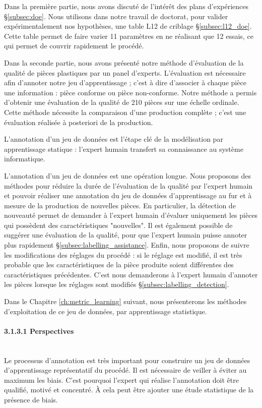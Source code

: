 Dans la première partie, nous avons discuté de l'intérêt des plans d'expériences §\ref{subsec:doe}.
Nous utilisons dans notre travail de doctorat, pour valider expérimentalement nos hypothèses, une table L12 de criblage §\ref{subsec:l12_doe}.
Cette table permet de faire varier 11 paramètres en ne réalisant que 12 essais, ce qui permet de couvrir rapidement le procédé.

Dans la seconde partie, nous avons présenté notre méthode d'évaluation de la qualité de pièces plastiques par un panel d'experts.
L'évaluation est nécessaire afin d'annoter notre jeu d'apprentissage ; c'est à dire d'associer à chaque pièce une information : pièce conforme ou pièce non-conforme.
Notre méthode a permis d'obtenir une évaluation de la qualité de 210 pièces sur une échelle ordinale.
Cette méthode nécessite la comparaison d'une production complète ; c'est une évaluation réalisée à posteriori de la production.

L'annotation d'un jeu de données est l'étape clé de la modélisation par apprentissage statique : l'expert humain transfert sa connaissance au système informatique.

L'annotation d'un jeu de données est une opération longue.
Nous proposons des méthodes pour réduire la durée de l'évaluation de la qualité par l'expert humain et pouvoir réaliser une annotation du jeu de données d'apprentissage au fur et à mesure de la production de nouvelles pièces.
En particulier, la détection de nouveauté permet de demander à l'expert humain d'évaluer uniquement les pièces qui possèdent des caractéristiques "nouvelles".
Il est également possible de suggérer une évaluation de la qualité, pour que l'expert humain puisse annoter plus rapidement §\ref{subsec:labelling_assistance}.
Enfin, nous proposons de suivre les modifications des réglages du procédé : si le réglage est modifié, il est très probable que les caractéristiques de la pièce produite soient différentes des caractéristiques précédentes.
C'est nous demanderons à l'expert humain d'annoter les pièces lorsque les réglages sont modifiés §\ref{subsec:labelling_detection}.

Dans le Chapitre \ref{ch:metric_learning} suivant, nous présenterons les méthodes d'exploitation de ce jeu de données, par apprentissage statistique.

\paragraph{3.1.3.1 Perspectives}\mbox{} \\
Le processus d'annotation est très important pour construire un jeu de données d'apprentissage représentatif du procédé.
Il est nécessaire de veiller à éviter au maximum les biais.
C'est pourquoi l'expert qui réalise l'annotation doit être qualifié, motivé et concentré.
À cela peut être ajouter une étude statistique de la présence de biais.

